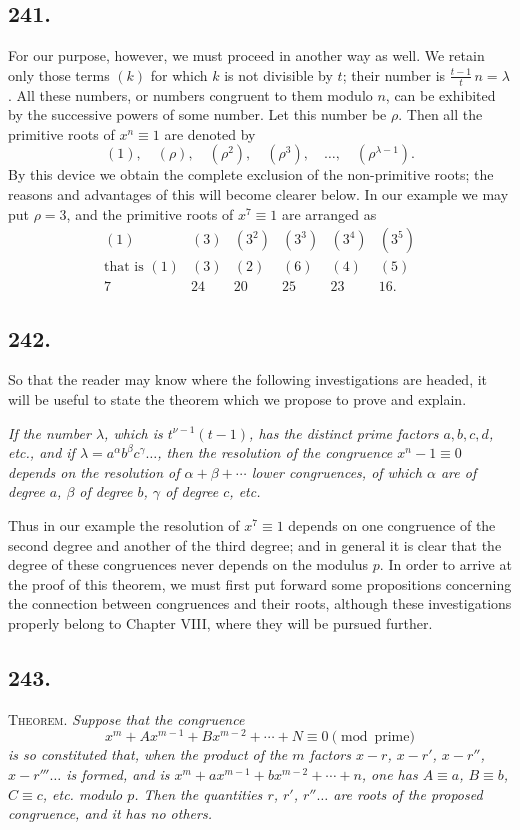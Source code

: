 \documentclass[12pt]{article}
\begin{document}
\subsection*{241.}
For our purpose, however, we must proceed in another way as well. We retain only those terms $(k)$ for which $k$ is not divisible by $t$; their number is $\frac{t-1}{t}\,n=\lambda$. All these numbers, or numbers congruent to them modulo $n$, can be exhibited by the successive powers of some number. Let this number be $\rho$. Then all the primitive roots of $x^n\equiv 1$ are denoted by
\[
(1),\quad (\rho),\quad (\rho^2),\quad (\rho^3),\quad \ldots,\quad (\rho^{\lambda-1}).
\]
By this device we obtain the complete exclusion of the non-primitive roots; the reasons and advantages of this will become clearer below. In our example we may put $\rho=3$, and the primitive roots of $x^7\equiv 1$ are arranged as
\[
\begin{array}{cccccc}
(1)&(3)&(3^2)&(3^3)&(3^4)&(3^5)\\
\text{that is }(1)&(3)&(2)&(6)&(4)&(5)\\
7&24&20&25&23&16.
\end{array}
\]

\subsection*{242.}
So that the reader may know where the following investigations are headed, it will be useful to state the theorem which we propose to prove and explain.

\textit{If the number $\lambda$, which is $t^{\nu-1}(t-1)$, has the distinct prime factors $a,b,c,d$, etc., and if $\lambda=a^\alpha b^\beta c^\gamma\ldots$, then the resolution of the congruence $x^n-1\equiv 0$ depends on the resolution of $\alpha+\beta+\cdots$ lower congruences, of which $\alpha$ are of degree $a$, $\beta$ of degree $b$, $\gamma$ of degree $c$, etc.}

Thus in our example the resolution of $x^7\equiv 1$ depends on one congruence of the second degree and another of the third degree; and in general it is clear that the degree of these congruences never depends on the modulus $p$. In order to arrive at the proof of this theorem, we must first put forward some propositions concerning the connection between congruences and their roots, although these investigations properly belong to Chapter VIII, where they will be pursued further.

\subsection*{243.}
\textsc{Theorem.} \textit{Suppose that the congruence}
\[
x^m+A x^{m-1}+B x^{m-2}+\cdots+N\equiv 0\pmod{\text{prime}}
\]
\textit{is so constituted that, when the product of the $m$ factors $x-r$, $x-r'$, $x-r''$, $x-r'''\ldots$ is formed, and is $x^m+a x^{m-1}+b x^{m-2}+\cdots+n$, one has $A\equiv a$, $B\equiv b$, $C\equiv c$, etc. modulo $p$. Then the quantities $r$, $r'$, $r''\ldots$ are roots of the proposed congruence, and it has no others.}
\end{document}
